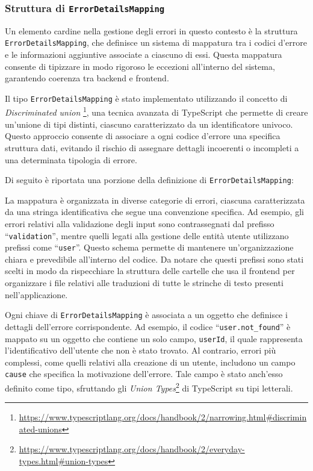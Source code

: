 \subsubsection{Struttura di \texttt{ErrorDetailsMapping}}
Un elemento cardine nella gestione degli errori in questo contesto è la struttura \texttt{ErrorDetailsMapping}, che definisce un sistema di mappatura tra i codici d'errore e le informazioni aggiuntive associate a ciascuno di essi. Questa mappatura consente di tipizzare in modo rigoroso le eccezioni all'interno del sistema, garantendo coerenza tra backend e frontend.

Il tipo \texttt{ErrorDetailsMapping} è stato implementato utilizzando il concetto di \textit{Discriminated union} \footnote{\url{https://www.typescriptlang.org/docs/handbook/2/narrowing.html\#discriminated-unions}}, una tecnica avanzata di TypeScript che permette di creare un'unione di tipi distinti, ciascuno caratterizzato da un identificatore univoco. Questo approccio consente di associare a ogni codice d'errore una specifica struttura dati, evitando il rischio di assegnare dettagli incoerenti o incompleti a una determinata tipologia di errore.

Di seguito è riportata una porzione della definizione di \texttt{ErrorDetailsMapping}:



La mappatura è organizzata in diverse categorie di errori, ciascuna caratterizzata da una stringa identificativa che segue una convenzione specifica. Ad esempio, gli errori relativi alla validazione degli input sono contrassegnati dal prefisso ``\texttt{validation}'', mentre quelli legati alla gestione delle entità utente utilizzano prefissi come ``\texttt{user}''. Questo schema permette di mantenere un'organizzazione chiara e prevedibile all'interno del codice. Da notare che questi prefissi sono stati scelti in modo da rispecchiare la struttura delle cartelle che usa il frontend per organizzare i file relativi alle traduzioni di tutte le strinche di testo presenti nell'applicazione.

Ogni chiave di \texttt{ErrorDetailsMapping} è associata a un oggetto che definisce i dettagli dell’errore corrispondente. Ad esempio, il codice ``\texttt{user.not\_found}'' è mappato su un oggetto che contiene un solo campo, \texttt{userId}, il quale rappresenta l'identificativo dell'utente che non è stato trovato. Al contrario, errori più complessi, come quelli relativi alla creazione di un utente, includono un campo \texttt{cause} che specifica la motivazione dell'errore. Tale campo è stato anch'esso definito come tipo, sfruttando gli \textit{Union Types}\footnote{\url{https://www.typescriptlang.org/docs/handbook/2/everyday-types.html\#union-types}} di TypeScript su tipi letterali.

